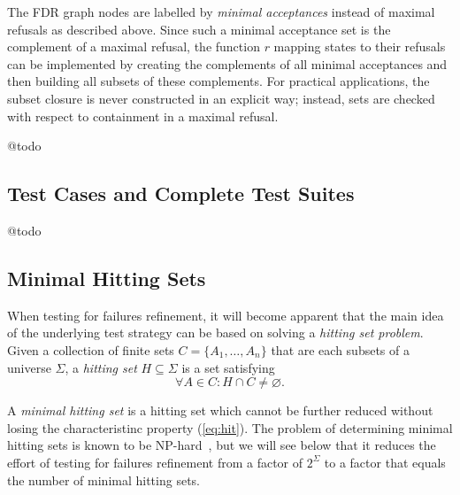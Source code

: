 The FDR graph nodes are labelled by \emph{minimal acceptances} instead of
maximal refusals as described above. Since such a minimal acceptance set is
the complement of a maximal refusal, the function $r$ mapping states to their
refusals can be implemented by creating the complements of all minimal
acceptances and then building all subsets of these complements. For practical
applications, the subset closure is never constructed in an explicit way;
instead, sets are checked with respect to containment in a maximal refusal.

@todo

%



\subsection{Test Cases and Complete Test Suites}
\label{sec:cspcompletedef}

@todo




\subsection{Minimal Hitting Sets}
\label{sec:hit}

When testing for failures refinement, it will become apparent that the main idea of the underlying test strategy can be based on solving a \emph{hitting set problem}. Given a collection of finite sets $C = \{ A_1,\dots,A_n\}$ that are each subsets of a universe $\Sigma$, a \emph{hitting set} $H\subseteq\Sigma$ is a set satisfying
\begin{equation}
\label{eq:hit}
\forall A\in C: H\cap C \neq\varnothing.
\end{equation}

A \emph{minimal hitting set} is a hitting set which cannot be further reduced without losing 
the characteristinc property (\ref{eq:hit}). The problem of determining minimal hitting sets is known to be NP-hard~\cite{Book1975-BOOKRM}, but we will see below that it reduces 
the effort of testing for failures refinement from a factor of $2^\Sigma$ to a factor that equals the number of minimal hitting sets.


